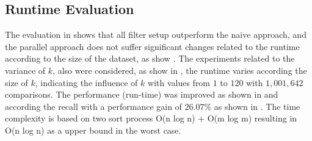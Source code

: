 \subsection{Runtime Evaluation}

The evaluation in  shows that all filter setup outperform the naive approach, and the parallel approach does not suffer significant changes related to the runtime according to the size of the dataset, as show .
The experiments related to the variance of $k$, also were considered, as show in , the runtime varies according the size of $k$, indicating the influence of $k$ with values from $1$ to $120$ with $1,001,642$ comparisons.
The performance (run-time) was improved as shown in  and according the recall with a performance gain of $26.07 \%$ as shown in . The time complexity is based on two sort process O(n log n) + O(m log m) resulting in O(n log n) as a upper bound in the worst case.

